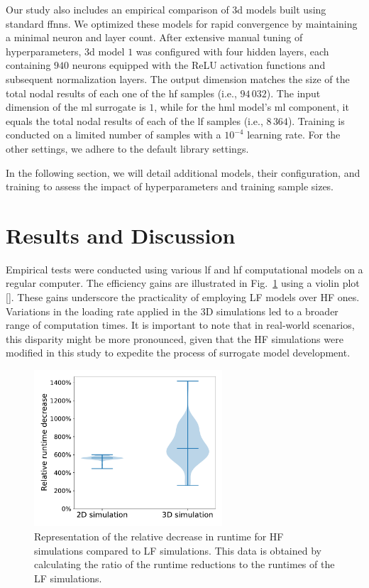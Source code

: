 \documentclass[12pt,a4paper]{report}
\begin{document}
Our study also includes an empirical comparison of \ac{3d} models built using standard \acp{ffnn}. We optimized these models for rapid convergence by maintaining a minimal neuron and layer count. After extensive manual tuning of hyperparameters, \ac{3d} model $1$ was configured with four hidden layers, each containing $940$ neurons equipped with the ReLU activation functions and subsequent normalization layers. The output dimension matches the size of the total nodal results of each one of the \ac{hf} samples (i.e., $94\,032$). The input dimension of the \ac{ml} surrogate is $1$, while for the \ac{hml} model's \ac{ml} component, it equals the total nodal results of each of the \ac{lf} samples (i.e., $8\,364$). Training is conducted on a limited number of samples with a $10^{-4}$ learning rate. For the other settings, we adhere to the default library settings.

In the following section, we will detail additional models, their configuration, and training to assess the impact of hyperparameters and training sample sizes.

\section{Results and Discussion}
%
Empirical tests were conducted using various \ac{lf} and \ac{hf} computational models on a regular computer. The efficiency gains are illustrated in Fig.~\ref{fig:runtime-comparison} using a violin plot [\cite{hintze1998}]. These gains underscore the practicality of employing LF models over HF ones. Variations in the loading rate applied in the 3D simulations led to a broader range of computation times. It is important to note that in real-world scenarios, this disparity might be more pronounced, given that the HF simulations were modified in this study to expedite the process of surrogate model development.
%
\begin{figure}[H]\centering
\includegraphics[trim={0cm 0.5cm 0cm 0cm},clip,width=7cm]{comparison.pdf}
\caption{Representation of the relative decrease in runtime for HF simulations compared to LF simulations. This data is obtained by calculating the ratio of the runtime reductions to the runtimes of the LF simulations.\label{fig:runtime-comparison}}
\end{figure}
\end{document}
